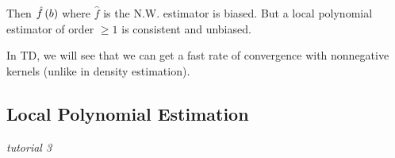 Then $\hat{f}\left(b\right)$ where $\hat{f}$ is the N.W. estimator is biased. But a
local polynomial estimator of order $\ge 1$ is consistent and unbiased.
\begin{remark}
    In TD, we will see that we can get a fast rate of convergence with nonnegative kernels (unlike in density estimation).
\end{remark}
\subsection{Local Polynomial Estimation}
\textit{tutorial 3}